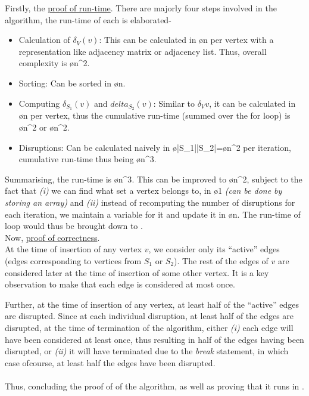 \documentclass[12pt,titlepage]{report}
\begin{document}
    Firstly, the \underline{proof of run-time}. There are majorly four steps involved in the algorithm, the run-time of each is elaborated-
    \begin{itemize}
        \item Calculation of $\delta_V(v)$: This can be calculated in \o{n} per vertex with a representation like adjacency matrix or adjacency list. Thus, overall complexity is \o{n^2}.
        \item Sorting: Can be sorted in \o{n}. 
        \item Computing $\delta_{S_1}(v)$ and $delta_{S_2}(v)$: Similar to $\delta_V{v}$, it can be calculated in \o{n} per vertex, thus the cumulative run-time (summed over the for loop) is \o{n^2} or \o{n^2}.
        \item Disruptions: Can be calculated naively in \o{|S_1||S_2|}=\o{n^2} per iteration, cumulative run-time thus being \o{n^3}.
    \end{itemize}
    Summarising, the run-time is \o{n^3}. This can be improved to \o{n^2}, subject to the fact that \textit{(i)} we can find what set a vertex belongs to, in \o{1} \textit{(can be done by storing an array)} and \textit{(ii)} instead of recomputing the number of disruptions for each iteration, we maintain a variable for it and update it in \o{n}. The run-time of loop would thus be brought down to .\\
    
    Now, \underline{proof of correctness}. \\
    At the time of insertion of any vertex $v$, we consider only its ``active'' edges (edges corresponding to vertices from $S_1$ or $S_2$). The rest of the edges of $v$ are considered later at the time of insertion of some other vertex. It is a key observation to make that each edge is considered at most once.
    
    Further, at the time of insertion of any vertex, at least half of the ``active'' edges are disrupted. Since at each individual disruption, at least half of the edges are disrupted, at the time of termination of the algorithm, either \textit{(i)} each edge will have been considered at least once, thus resulting in half of the edges having been disrupted, or \textit{(ii)} it will have terminated due to the \textit{break} statement, in which case ofcourse, at least half the edges have been disrupted.\\ \\
    
    Thus, concluding the proof of  of the algorithm, as well as proving that it runs in .
\newpage
\end{document}

